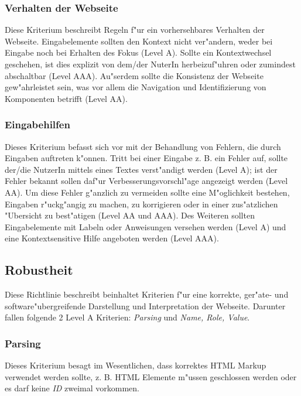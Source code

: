 \documentclass[a4paper,bibtotoc,oneside]{scrbook}
\begin{document}
\subsubsection{Verhalten der Webseite}
Diese Kriterium beschreibt Regeln f"ur ein vorhersehbares Verhalten der Webseite. Eingabelemente sollten den Kontext nicht ver"andern, weder bei Eingabe noch bei Erhalten des Fokus (Level A). Sollte ein Kontextwechsel geschehen, ist dies explizit von dem/der NuterIn herbeizuf"uhren oder zumindest abschaltbar (Level AAA). Au"serdem sollte die Konsistenz der Webseite gew"ahrleistet sein, was vor allem die Navigation und Identifizierung von Komponenten betrifft (Level AA). \cite[Abschnitt 3.2]{wcag2}

\subsubsection{Eingabehilfen}
Dieses Kriterium befasst sich vor mit der Behandlung von Fehlern, die durch Eingaben auftreten k"onnen. Tritt bei einer Eingabe z. B. ein Fehler auf, sollte der/die NutzerIn mittels eines Textes verst"andigt werden (Level A); ist der Fehler bekannt sollen daf"ur Verbesserungsvorschl"age angezeigt werden (Level AA). Um diese Fehler g"anzlich zu vermeiden sollte eine M"oglichkeit bestehen, Eingaben r"uckg"angig zu machen, zu korrigieren oder in einer zus"atzlichen "Ubersicht zu best"atigen (Level AA und AAA). Des Weiteren sollten Eingabelemente mit Labeln oder Anweisungen versehen werden (Level A) und eine Kontextsensitive Hilfe angeboten werden (Level AAA). \cite[Abschnitt 3.3]{wcag2}

\subsection{Robustheit}
Diese Richtlinie beschreibt beinhaltet Kriterien f"ur eine korrekte, ger"ate- und software"ubergreifende Darstellung und Interpretation der Webseite. Darunter fallen folgende 2 Level A Kriterien: \emph{Parsing} und \emph{Name, Role, Value}. \cite[Abschnitt 4.1]{wcag2}

\subsubsection{Parsing}
Dieses Kriterium besagt im Wesentlichen, dass korrektes HTML Markup verwendet werden sollte, z. B. HTML Elemente m"ussen geschlossen werden oder es darf keine \emph{ID} zweimal vorkommen. \cite[Abschnitt 4.1.1]{wcag2}
\end{document}
